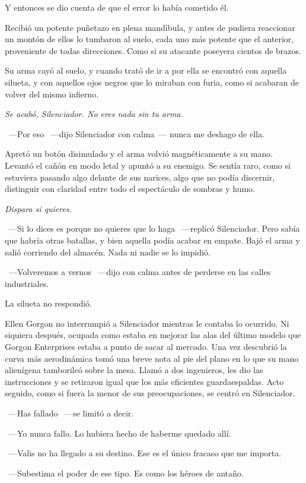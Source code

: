 Y entonces se dio cuenta de que el error lo había cometido él.

Recibió un potente puñetazo en plena mandíbula, y antes de pudiera reaccionar un montón de ellos lo tumbaron al suelo, cada uno más potente que el anterior, proveniente de todas direcciones. Como si su atacante poseyera cientos de brazos.

Su arma cayó al suelo, y cuando trató de ir a por ella se encontró con aquella silueta, y con aquellos ojos negros que lo miraban con furia, como si acabaran de volver del mismo infierno.

\emph{Se acabó, Silenciador. No eres nada sin tu arma.}

~---Por eso ~---dijo Silenciador con calma~--- nunca me deshago de ella.

Apretó un botón disimulado y el arma volvió magnéticamente a su mano. Levantó el cañón en modo letal y apuntó a su enemigo. Se sentía raro, como si estuviera pasando algo delante de sus narices, algo que no podía discernir, distinguir con claridad entre todo el espectáculo de sombras y humo.

\emph{Dispara si quieres.}

~---Si lo dices es porque no quieres que lo haga ~---replicó Silenciador. Pero sabía que habría otras batallas, y bien aquella podía acabar en empate. Bajó el arma y salió corriendo del almacén. Nada ni nadie se lo impidió.

~---Volveremos a vernos ~---dijo con calma antes de perderse en las calles industriales.

La silueta no respondió.

\parbreak
Ellen Gorgon no interrumpió a Silenciador mientras le contaba lo ocurrido. Ni siquiera después, ocupada como estaba en mejorar las alas del último modelo que Gorgon Enterprises estaba a punto de sacar al mercado. Una vez descubrió la curva más aerodinámica tomó una breve nota al pie del plano en lo que su mano alienígena tamborileó sobre la mesa. Llamó a dos ingenieros, les dio las instrucciones y se retiraron igual que los más eficientes guardaespaldas. Acto seguido, como si fuera la menor de sus preocupaciones, se centró en Silenciador.

~---Has fallado ~---se limitó a decir.

~---Yo nunca fallo. Lo hubiera hecho de haberme quedado allí.

~---Valis no ha llegado a su destino. Ese es el único fracaso que me importa.

~---Subestima el poder de ese tipo. Es como los héroes de antaño.

